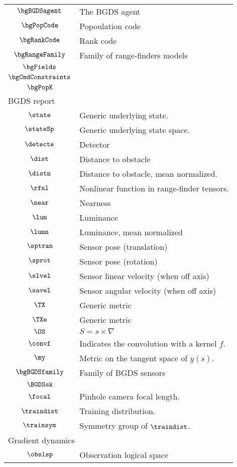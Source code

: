\begin{longtable}{cl}
 $\bgBGDSagent$ &  The BGDS agent\\ 
 $\bgPopCode$ &  Popoulation code\\ 
 $\bgRankCode$ &  Rank code\\ 
 $\bgRangeFamily$ &  Family of range-finders models\\ 
 $\bgFields$ & \\ 
 $\bgCmdConstraints$ & \\ 
 $\bgPopK$ & \\ 
 \multicolumn{2}{l}{BGDS report}\\ 
 \hline
$\state$ &  Generic underlying state.\\ 
 $\stateSp$ &  Generic underlying state space.\\ 
 $\detecte$ &  Detector\\ 
 $\dist$ &  Distance to obstacle\\ 
 $\distn$ &  Distance to obstacle, mean normalized.\\ 
 $\rfnl$ &  Nonlinear function in range-finder tensors.\\ 
 $\near$ &  Nearness\\ 
 $\lum$ &  Luminance\\ 
 $\lumn$ &  Luminance, mean normalized\\ 
 $\sptran$ &  Sensor pose (translation)\\ 
 $\sprot$ &  Sensor pose (rotation)\\ 
 $\slvel$ &  Sensor linear velocity (when off axis)\\ 
 $\savel$ &  Sensor angular velocity (when off axis)\\ 
 $\TX$ &  Generic metric\\ 
 $\TXe$ &  Generic metric\\ 
 $\OS$ &  $S = s\times \nabla$\\ 
 $\convf$ &  Indicates the convolution with a kernel $f$.\\ 
 $\my$ &  Metric on the tangent space of $y(s)$.\\ 
 $\bgBGDSfamily$ &  Family of BGDS sensors\\ 
 $\BGDSsk$ & \\ 
 $\focal$ &  Pinhole camera focal length.\\ 
 $\traindist$ &  Training distribution.\\ 
 $\trainsym$ &  Symmetry group of $\traindist$.\\ 
 \multicolumn{2}{l}{Gradient dynamics}\\ 
 \hline
$\obslsp$ &  Observation logical space\\ 

\end{longtable}
